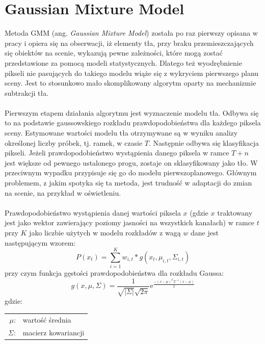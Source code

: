 \section{Gaussian Mixture Model}
\label{sec:GMM}
Metoda GMM (ang. \textit{Gaussian Mixture Model}) została po raz pierwszy opisana w pracy \citep{zivkovic2004improved} i opiera się na obserwacji, iż elementy tła, przy braku przemieszczających się obiektów na scenie, wykazują pewne zależności, które mogą zostać przedstawione za pomocą modeli statystycznych. Dlatego też wyodrębnienie pikseli nie pasujących do takiego modelu wiąże się z wykryciem pierwszego planu sceny. Jest to stosunkowo mało skomplikowany algorytm oparty na mechanizmie subtrakcji tła.
\paragraph{}
Pierwszym etapem działania algorytmu jest wyznaczenie modelu tła. Odbywa się to na podstawie gaussowskiego rozkładu prawdopodobieństwa dla każdego piksela sceny. Estymowane wartości modelu tła otrzymywane są w wyniku analizy określonej liczby próbek, tj. ramek, w czasie $T$. Następnie odbywa się klasyfikacja pikseli. Jeżeli prawdopodobieństwo wystąpienia danego piksela w ramce $T+n$ jest większe od pewnego ustalonego progu, zostaje on sklasyfikowany jako tło. W\,przeciwnym wypadku przypisuje się go do modelu pierwszoplanowego. Głównym problemem, z jakim spotyka się ta metoda, jest trudność w adaptacji do zmian na scenie, na przykład w oświetleniu.
\paragraph{}
Prawdopodobieństwo wystąpienia danej wartości piksela $x$ (gdzie $x$ traktowany jest jako wektor zawierający poziomy jasności na wszystkich kanałach) w ramce $t$ przy $K$ jako liczbie użytych w modelu rozkładów z wagą $w$ dane jest następującym wzorem:
\begin{equation}
P(x_{t}) = \sum_{i=1}^{K} w_{i,t}*g(x_{t},\mu_{i,t},\Sigma_{i,t})
\end{equation}
przy czym funkcja gęstości prawdopodobieństwa dla rozkładu Gaussa:
\begin{equation}
g(x,\mu,\Sigma) = \frac{1}{\sqrt{|\Sigma|}\sqrt{2\pi}}\mathrm{e}^\frac{-(x-\mu)^T\Sigma^{-1}(x-\mu)}{2}
\end{equation}
gdzie:\\ 
\hspace*{3em}
\begin{tabular}{r l}
$\mu$: & wartość średnia \\
$\Sigma$: & macierz kowariancji
\end{tabular} \\

